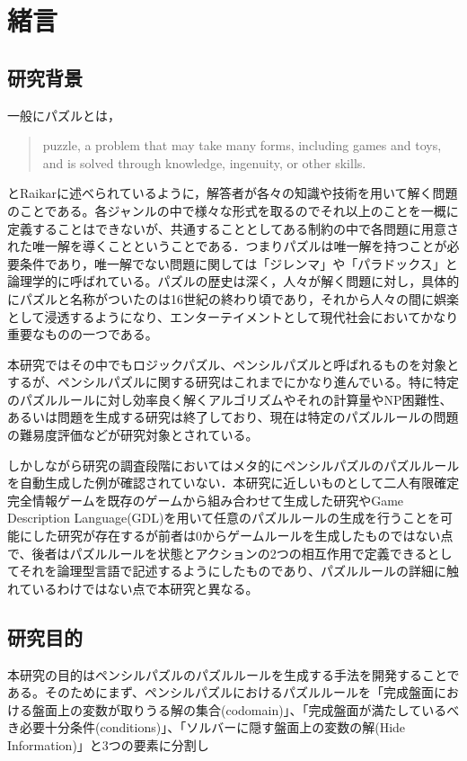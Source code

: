 \chapter{緒言}
\section{研究背景}
一般にパズルとは，
\begin{quote}
	puzzle, a problem that may take many forms, including games and toys, and is solved through knowledge, ingenuity, or other skills.
\end{quote}
とRaikar\cite{Raikar2022}に述べられているように，解答者が各々の知識や技術を用いて解く問題のことである。各ジャンルの中で様々な形式を取るのでそれ以上のことを一概に定義することはできないが、共通することとしてある制約の中で各問題に用意された唯一解を導くことということである．つまりパズルは唯一解を持つことが必要条件であり，唯一解でない問題に関しては「ジレンマ」や「パラドックス」と論理学的に呼ばれている\cite{web:puzzle}。パズルの歴史は深く，人々が解く問題に対し，具体的にパズルと名称がついたのは16世紀の終わり頃であり，それから人々の間に娯楽として浸透するようになり、エンターテイメントとして現代社会においてかなり重要なものの一つである。

本研究ではその中でもロジックパズル、ペンシルパズルと呼ばれるものを対象とするが、ペンシルパズルに関する研究はこれまでにかなり進んでいる。特に特定のパズルルールに対し効率良く解くアルゴリズムやそれの計算量やNP困難性、あるいは問題を生成する研究は終了しており、現在は特定のパズルルールの問題の難易度評価などが研究対象とされている。

しかしながら研究の調査段階においてはメタ的にペンシルパズルのパズルルールを自動生成した例が確認されていない．本研究に近しいものとして二人有限確定完全情報ゲームを既存のゲームから組み合わせて生成した研究やGame Description Language(GDL)を用いて任意のパズルルールの生成を行うことを可能にした研究が存在するが前者は0からゲームルールを生成したものではない点で、後者はパズルルールを状態とアクションの2つの相互作用で定義できるとしてそれを論理型言語で記述するようにしたものであり、パズルルールの詳細に触れているわけではない点で本研究と異なる。


\section{研究目的}
本研究の目的はペンシルパズルのパズルルールを生成する手法を開発することである。そのためにまず、ペンシルパズルにおけるパズルルールを「完成盤面における盤面上の変数が取りうる解の集合(codomain)」、「完成盤面が満たしているべき必要十分条件(conditions)」、「ソルバーに隠す盤面上の変数の解(Hide Information)」と3つの要素に分割し
